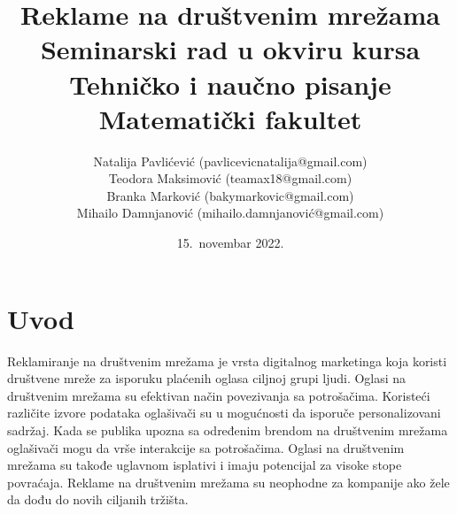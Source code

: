 \documentclass[a4paper]{article}
\title{Reklame na društvenim mrežama\\ \small{Seminarski rad u okviru kursa\\Tehničko i naučno pisanje\\ Matematički fakultet}}
\author{Natalija Pavlićević (pavlicevicnatalija@gmail.com)\\ Teodora Maksimović (teamax18@gmail.com)\\ Branka Marković (bakymarkovic@gmail.com)\\ Mihailo Damnjanović (mihailo.damnjanović@gmail.com)}
\date{15.~novembar 2022.}
\begin{document}
	\renewcommand{\abstractname}{Apstrakt}
	\renewcommand{\contentsname}{Sadržaj}
	\tableofcontents
	
	\newpage
	
	\section{Uvod}
	\label{sec:uvod}
	Reklamiranje na društvenim mrežama je vrsta digitalnog marketinga koja koristi društvene mreže za isporuku plaćenih oglasa ciljnoj grupi ljudi. Oglasi na društvenim mrežama su efektivan način povezivanja sa potrošačima. Koristeći različite izvore podataka oglašivači su u mogućnosti da isporuče personalizovani sadržaj. Kada se publika upozna sa određenim brendom na društvenim mrežama oglašivači mogu da vrše interakcije sa potrošačima. Oglasi na društvenim mrežama su takođe uglavnom isplativi i imaju potencijal za visoke stope povraćaja. Reklame na društvenim mrežama su neophodne za kompanije ako žele da dođu do novih ciljanih tržišta. 
	
\end{document}

